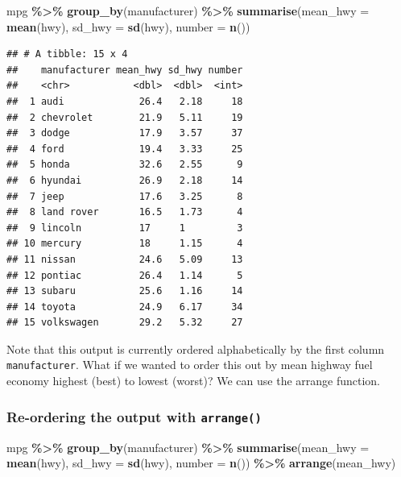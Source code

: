\documentclass[
]{book}
\newenvironment{Shaded}{\begin{snugshade}}{\end{snugshade}}
\newcommand{\AttributeTok}[1]{\textcolor[rgb]{0.13,0.29,0.53}{#1}}
\newcommand{\FunctionTok}[1]{\textcolor[rgb]{0.13,0.29,0.53}{\textbf{#1}}}
\newcommand{\NormalTok}[1]{#1}
\newcommand{\SpecialCharTok}[1]{\textcolor[rgb]{0.81,0.36,0.00}{\textbf{#1}}}
\begin{document}
\begin{Shaded}
\begin{Highlighting}[]
\NormalTok{mpg }\SpecialCharTok{\%\textgreater{}\%}
  \FunctionTok{group\_by}\NormalTok{(manufacturer) }\SpecialCharTok{\%\textgreater{}\%}
  \FunctionTok{summarise}\NormalTok{(}\AttributeTok{mean\_hwy =} \FunctionTok{mean}\NormalTok{(hwy), }\AttributeTok{sd\_hwy =} \FunctionTok{sd}\NormalTok{(hwy), }\AttributeTok{number =} \FunctionTok{n}\NormalTok{())}
\end{Highlighting}
\end{Shaded}

\begin{verbatim}
## # A tibble: 15 x 4
##    manufacturer mean_hwy sd_hwy number
##    <chr>           <dbl>  <dbl>  <int>
##  1 audi             26.4   2.18     18
##  2 chevrolet        21.9   5.11     19
##  3 dodge            17.9   3.57     37
##  4 ford             19.4   3.33     25
##  5 honda            32.6   2.55      9
##  6 hyundai          26.9   2.18     14
##  7 jeep             17.6   3.25      8
##  8 land rover       16.5   1.73      4
##  9 lincoln          17     1         3
## 10 mercury          18     1.15      4
## 11 nissan           24.6   5.09     13
## 12 pontiac          26.4   1.14      5
## 13 subaru           25.6   1.16     14
## 14 toyota           24.9   6.17     34
## 15 volkswagen       29.2   5.32     27
\end{verbatim}

Note that this output is currently ordered alphabetically by the first column \texttt{manufacturer}. What if we wanted to order this out by mean highway fuel economy highest (best) to lowest (worst)? We can use the arrange function.

\hypertarget{re-ordering-the-output-with-arrange}{%
\subsubsection*{\texorpdfstring{Re-ordering the output with \texttt{arrange()}}{Re-ordering the output with arrange()}}\label{re-ordering-the-output-with-arrange}}

\begin{Shaded}
\begin{Highlighting}[]
\NormalTok{mpg }\SpecialCharTok{\%\textgreater{}\%}
  \FunctionTok{group\_by}\NormalTok{(manufacturer) }\SpecialCharTok{\%\textgreater{}\%}
  \FunctionTok{summarise}\NormalTok{(}\AttributeTok{mean\_hwy =} \FunctionTok{mean}\NormalTok{(hwy), }\AttributeTok{sd\_hwy =} \FunctionTok{sd}\NormalTok{(hwy), }\AttributeTok{number =} \FunctionTok{n}\NormalTok{()) }\SpecialCharTok{\%\textgreater{}\%}
  \FunctionTok{arrange}\NormalTok{(mean\_hwy)}
\end{Highlighting}
\end{Shaded}
\end{document}
